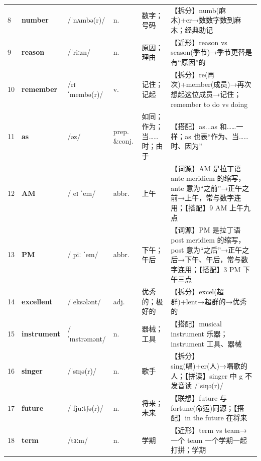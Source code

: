 \documentclass[UTF8,a4paper,11pt,oneside]{ctexbook}
\newcommand{\cellword}[1]{{\bfseries\textcolor{wordcol}{#1}}}
\newcommand{\cellipa}[1]{{\footnotesize\textcolor{ipacol}{#1}}}
\newcommand{\cellpos}[1]{\textcolor{poscol}{#1}}
\newcommand{\cellno}[1]{\textcolor{volcolor!75!black}{#1}}
\begin{document}
{\begin{longtable}{@{}C{0.045\textwidth}L{0.155\textwidth}L{0.175\textwidth}C{0.070\textwidth}L{0.180\textwidth}L{0.282\textwidth}@{}}
\cellno{8} & \cellword{number} & \cellipa{/ˈnʌmbə(r)/} & \cellpos{n.} & 数字；号码 & \textcolor{tagSplit}{【拆分】}numb(麻木)+er→\allowbreak{}数数字数到麻木；经典助记 \\
 \cellno{9} & \cellword{reason} & \cellipa{/ˈriːzn/} & \cellpos{n.} & 原因；理由 & \textcolor{tagNear}{【近形】}reason vs season(季节)→\allowbreak{}季节更替是有“原因”的 \\
\cellno{10} & \cellword{remember} & \cellipa{/rɪˈmembə(r)/} & \cellpos{v.} & 记住；记起 & \textcolor{tagSplit}{【拆分】}re(再次)+member(成员)→\allowbreak{}再次想起这位成员→\allowbreak{}记住；remember to do vs doing \\
 \cellno{11} & \cellword{as} & \cellipa{/əz/} & \cellpos{prep. \&conj.} & 如同；作为；当……时；由于 & \textcolor{tagColloc}{【搭配】}as...as 和……一样；as 也表“作为、当……时、因为” \\
\cellno{12} & \cellword{AM} & \cellipa{/ˌeɪ ˈem/} & \cellpos{abbr.} & 上午 & \textcolor{tagEtym}{【词源】}AM 是拉丁语 ante meridiem 的缩写，ante 意为“之前”→\allowbreak{}正午之前→\allowbreak{}上午，常与数字连用；\textcolor{tagColloc}{【搭配】}9 AM 上午九点 \\
 \cellno{13} & \cellword{PM} & \cellipa{/ˌpiː ˈem/} & \cellpos{abbr.} & 下午；午后 & \textcolor{tagEtym}{【词源】}PM 是拉丁语 post meridiem 的缩写，post 意为“之后”→\allowbreak{}正午之后→\allowbreak{}下午、午后，常与数字连用；\textcolor{tagColloc}{【搭配】}3 PM 下午三点 \\
\cellno{14} & \cellword{excellent} & \cellipa{/ˈeksələnt/} & \cellpos{adj.} & 优秀的；极好的 & \textcolor{tagSplit}{【拆分】}excel(超群)+lent→\allowbreak{}超群的→\allowbreak{}优秀的 \\
 \cellno{15} & \cellword{instrument} & \cellipa{/ˈɪnstrəmənt/} & \cellpos{n.} & 器械；工具 & \textcolor{tagColloc}{【搭配】}musical instrument 乐器；instrument 工具、器械 \\
\cellno{16} & \cellword{singer} & \cellipa{/ˈsɪŋə(r)/} & \cellpos{n.} & 歌手 & \textcolor{tagSplit}{【拆分】}sing(唱)+er(人)→\allowbreak{}唱歌的人；\textcolor{tagSpell}{【拼读】}singer 中 g 不发音读 /ˈsɪŋə(r)/ \\
 \cellno{17} & \cellword{future} & \cellipa{/ˈfjuːtʃə(r)/} & \cellpos{n.} & 将来；未来 & \textcolor{tagAssoc}{【联想】}future 与 fortune(命运)同源；\textcolor{tagColloc}{【搭配】}in the future 在将来 \\
\cellno{18} & \cellword{term} & \cellipa{/tɜːm/} & \cellpos{n.} & 学期 & \textcolor{tagNear}{【近形】}term vs team→\allowbreak{}一个 team 一个学期一起打拼；学期 \\

\end{longtable}}
\end{document}
